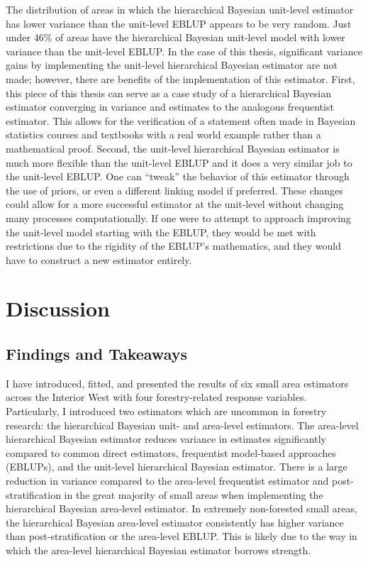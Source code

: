 \documentclass[12pt,twoside]{reedthesis}
\begin{document}
The distribution of areas in which the hierarchical Bayesian unit-level estimator has lower variance than the unit-level EBLUP appears to be very random. Just under 46\% of areas have the hierarchical Bayesian unit-level model with lower variance than the unit-level EBLUP. In the case of this thesis, significant variance gains by implementing the unit-level hierarchical Bayesian estimator are not made; however, there are benefits of the implementation of this estimator. First, this piece of this thesis can serve as a case study of a hierarchical Bayesian estimator converging in variance and estimates to the analogous frequentist estimator. This allows for the verification of a statement often made in Bayesian statistics courses and textbooks with a real world example rather than a mathematical proof. Second, the unit-level hierarchical Bayesian estimator is much more flexible than the unit-level EBLUP and it does a very similar job to the unit-level EBLUP. One can ``tweak'' the behavior of this estimator through the use of priors, or even a different linking model if preferred. These changes could allow for a more successful estimator at the unit-level without changing many processes computationally. If one were to attempt to approach improving the unit-level model starting with the EBLUP, they would be met with restrictions due to the rigidity of the EBLUP's mathematics, and they would have to construct a new estimator entirely.

\hypertarget{discussion}{%
\chapter{Discussion}\label{discussion}}

\hypertarget{findings-and-takeaways}{%
\section{Findings and Takeaways}\label{findings-and-takeaways}}

I have introduced, fitted, and presented the results of six small area estimators across the Interior West with four forestry-related response variables. Particularly, I introduced two estimators which are uncommon in forestry research: the hierarchical Bayesian unit- and area-level estimators. The area-level hierarchical Bayesian estimator reduces variance in estimates significantly compared to common direct estimators, frequentist model-based approaches (EBLUPs), and the unit-level hierarchical Bayesian estimator. There is a large reduction in variance compared to the area-level frequentist estimator and post-stratification in the great majority of small areas when implementing the hierarchical Bayesian area-level estimator. In extremely non-forested small areas, the hierarchical Bayesian area-level estimator consistently has higher variance than post-stratification or the area-level EBLUP. This is likely due to the way in which the area-level hierarchical Bayesian estimator borrows strength.
\end{document}
